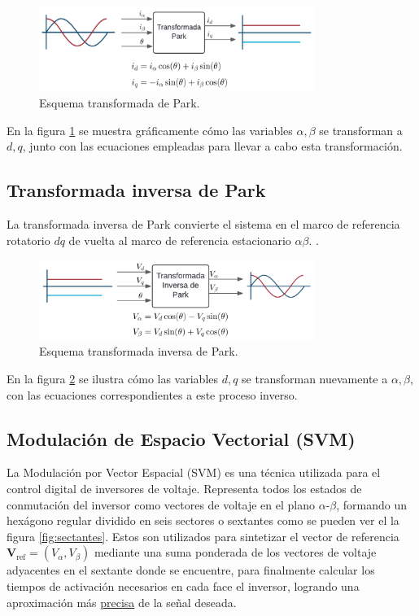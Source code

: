 \documentclass[11pt]{report}
\begin{document}
\begin{figure}[ht]
	\centering
	\includegraphics[width=0.8\textwidth]{imagenes/Diagramas/park.png}
	\caption{Esquema transformada de Park.}
	\label{fig:park_transform}
\end{figure}
\FloatBarrier

En la figura \ref{fig:park_transform} se muestra gráficamente cómo las variables \(\alpha, \beta\) se transforman a \(d, q\), junto con las ecuaciones empleadas para llevar a cabo esta transformación.

\subsection{Transformada inversa de Park}
La transformada inversa de Park convierte el sistema en el marco de referencia rotatorio \(dq\) de vuelta al marco de referencia estacionario \(\alpha\beta\). \cite{AN1078}.

\begin{figure}[ht]
	\centering
	\includegraphics[width=0.8\textwidth]{imagenes/Diagramas/park_inv.png}
	\caption{Esquema transformada inversa de Park.}
	\label{fig:park_inv_transform}
\end{figure}
\FloatBarrier

En la figura \ref{fig:park_inv_transform} se ilustra cómo las variables \(d, q\) se transforman nuevamente a \(\alpha, \beta\), con las ecuaciones correspondientes a este proceso inverso.

\subsection{Modulación de Espacio Vectorial (SVM)}
La Modulación por Vector Espacial (SVM) es una técnica utilizada para el control digital de inversores de voltaje. Representa todos los estados de conmutación del inversor como vectores de voltaje en el plano $\alpha$-$\beta$, formando un hexágono regular dividido en seis sectores o sextantes como se pueden ver el la figura \ref{fig:sectantes}. Estos son utilizados para sintetizar el vector de referencia $\mathbf{V}_{\text{ref}}=(V_{\alpha},V_{\beta})$ mediante una suma ponderada de los vectores de voltaje adyacentes en el sextante donde se encuentre, para finalmente calcular los tiempos de activación necesarios en cada face el inversor, logrando una aproximación más \href{https://www.youtube.com/watch?v=NY0ffyEu6uo}{precisa} de la señal deseada.
\end{document}
